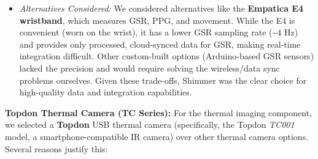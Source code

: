 \documentclass[12pt,a4paper]{article}
\begin{document}
\begin{itemize}
\item
  \emph{Alternatives Considered:} We considered alternatives like the \textbf{Empatica E4 wristband}, which measures GSR, PPG, and movement. While the E4 is convenient (worn on the wrist), it has a lower GSR sampling rate (\textasciitilde4 Hz) and provides only processed, cloud-synced data for GSR, making real-time integration difficult. Other custom-built options (Arduino-based GSR sensors) lacked the precision and would require solving the wireless/data sync problems ourselves. Given these trade-offs, Shimmer was the clear choice for high-quality data and integration capabilities.
\end{itemize}

\textbf{Topdon Thermal Camera (TC Series):} For the thermal imaging component, we selected a \textbf{Topdon} USB thermal camera (specifically, the Topdon \emph{TC001} model, a smartphone-compatible IR camera) over other thermal camera options. Several reasons justify this:
\end{document}
